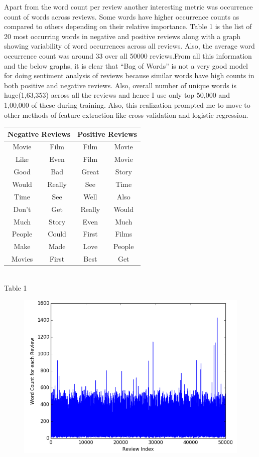 \documentclass[11pt]{article}
\begin{document}
Apart from the word count per review another interesting metric was occurrence count of words across reviews. Some words have higher occurrence counts as compared to others depending on their relative importance. Table 1 is the list of 20 most occurring words in negative and positive reviews along with a graph showing variability of word occurrences across all reviews. Also, the average word occurrence count was around 33 over all 50000 reviews.From all this information and the below graphs, it is clear that “Bag of Words” is not a very good model for doing sentiment analysis of reviews because similar words have high counts in both positive and negative reviews. Also, overall number of unique words is huge(1,63,353) across all the reviews and hence I use only top 50,000 and 1,00,000 of these during training. Also, this realization prompted me to move to other methods of feature extraction like cross validation and logistic regression.
\begin{center}
\begin{tabular}{|c|c|c|c|}
\hline
 \multicolumn{2}{|c|}{Negative Reviews} 
 &\multicolumn{2}{|c|}{Positive Reviews} \\
 \hline
Movie &  Film & Film & Movie \\
\hline
Like&Even&Film&Movie\\
\hline
Good&Bad&Great&Story\\
\hline
Would&Really&See&Time\\
\hline
Time&See&Well&Also\\
\hline
Don't&Get&Really&Would\\
\hline
Much&Story&Even&Much\\
\hline
People&Could&First&Films\\
\hline
Make&Made&Love&People\\
\hline
Movies&First&Best&Get\\
\hline
\end{tabular}
\\
\bigskip
Table 1
\end{center}
\begin{figure}[h!]
  \centering
    \includegraphics[width=\linewidth]{2.png}
    \caption{}
\end{figure}
\end{document}
